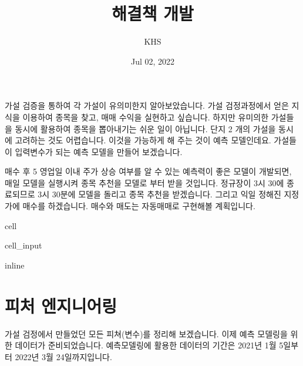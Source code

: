 \documentclass[letterpaper,10pt,english]{jupyterBook}
\title{해결책 개발}
\date{Jul 02, 2022}
\author{KHS}
\begin{document}
\pagestyle{empty}
\sphinxmaketitle
\pagestyle{plain}
\sphinxtableofcontents
\pagestyle{normal}
\label{\detokenize{chapter5/5.2.0_Solution_Details::doc}}


\sphinxAtStartPar
가설 검증을 통하여 각 가설이 유의미한지 알아보았습니다. 가설 검정과정에서 얻은 지식을 이용하여  종목을 찾고, 매매 수익을 실현하고 싶습니다. 하지만 유미의한 가설들을 동시에 활용하여 종목을 뽑아내기는 쉬운 일이 아닙니다.  단지 2 개의 가설을 동시에 고려하는 것도 어렵습니다.  이것을 가능하게 해 주는 것이 예측 모델인데요. 가설들이 입력변수가 되는 예측 모델을 만들어 보겠습니다.

\sphinxAtStartPar
매수 후 5 영업일 이내 주가 상승 여부를 알 수 있는 예측력이 좋은 모델이 개발되면, 매일 모델을 실행시켜 종목 추천을 모델로 부터 받을 것입니다. 정규장이 3시 30에 종료되므로 3시 30분에 모델을 돌리고 종목 추천을 받겠습니다. 그리고 익일 정해진 지정가에 매수를 하겠습니다. 매수와 매도는 자동매매로 구현해볼 계획입니다.

\begin{sphinxuseclass}{cell}\begin{sphinxVerbatimInput}

\begin{sphinxuseclass}{cell_input}
\begin{sphinxVerbatim}[commandchars=\\\{\}]
   
 inline
   
   
   

  
\end{sphinxVerbatim}

\end{sphinxuseclass}\end{sphinxVerbatimInput}

\end{sphinxuseclass}

\part{피처 엔지니어링}
\label{\detokenize{chapter5/5.2.1_Feature_Engineering:id1}}\label{\detokenize{chapter5/5.2.1_Feature_Engineering::doc}}
\sphinxAtStartPar
가설 검정에서 만들었던 모든 피쳐(변수)를 정리해 보겠습니다. 이제 예측 모델링을 위한 데이터가 준비되었습니다. 예측모델링에 활용한 데이터의 기간은 2021년 1월 5일부터 2022년 3월 24일까지입니다.
\end{document}
